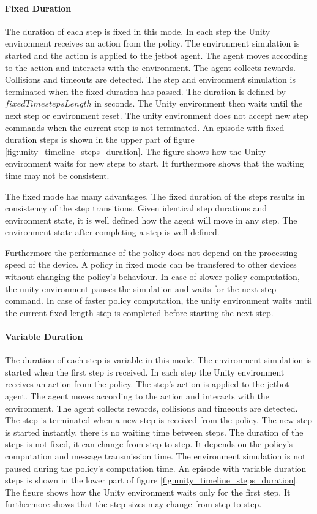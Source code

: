 \paragraph{Fixed Duration}

The duration of each step is fixed in this mode. In each step the Unity environment receives an action from the policy. The environment simulation is started and the action is applied to the jetbot agent. The agent moves according to the action and interacts with the environment. The agent collects rewards.  Collisions and timeouts are detected. The step and environment simulation is terminated when the fixed duration has passed. The duration is defined by $fixedTimestepsLength$ in seconds. The Unity environment then waits until the next step or environment reset. The unity environment does not accept new step commands when the current step is not terminated.
An episode with fixed duration steps is shown in the upper part of figure \ref{fig:unity_timeline_steps_duration}. The figure shows how the Unity environment waits for new steps to start. It furthermore shows that the waiting time may not be consistent.

The fixed mode has many advantages. The fixed duration of the steps results in consistency of the step transitions. Given identical step durations and environment state, it is well defined how the agent will move in any step. The environment state after completing a step is well defined.

Furthermore the performance of the policy does not depend on the processing speed of the device. A policy in fixed mode can be transfered to other devices without changing the policy's behaviour. In case of slower policy computation, the unity environment pauses the simulation and waits for the next step command. In case of faster policy computation, the unity environment waits until the current fixed length step is completed before starting the next step.


\paragraph{Variable Duration}

The duration of each step is variable in this mode. The environment simulation is started when the first step is received. In each step the Unity environment receives an action from the policy. The step's action is applied to the jetbot agent. The agent moves according to the action and interacts with the environment. The agent collects rewards, collisions and timeouts are detected. The step is terminated when a new step is received from the policy. The new step is started instantly, there is no waiting time between steps.
The duration of the steps is not fixed, it can change from step to step. It depends on the policy's computation and message transmission time. The environment simulation is not paused during the policy's computation time.
An episode with variable duration steps is shown in the lower part of figure \ref{fig:unity_timeline_steps_duration}. The figure shows how the Unity environment waits only for the first step. It furthermore shows that the step sizes may change from step to step.

